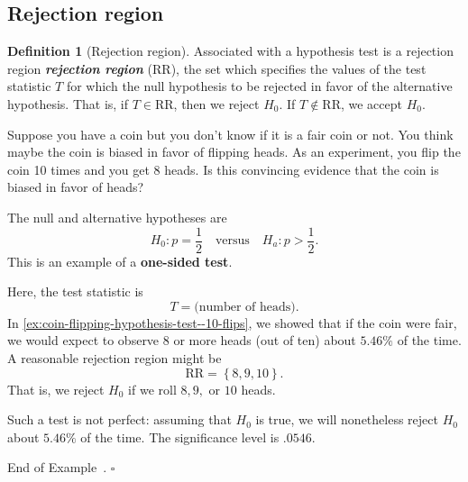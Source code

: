 \documentclass[10pt]{article}
\theoremstyle{definition}
\newtheorem{definition}[theorem]{Definition}
\newtheorem{example}[theorem]{Example}
\renewenvironment{example}
{\begin{oldexample}}
  {\par\smallskip\hfill   End of Example~\theexample. $\square$    \par\end{oldexample}}
\newcommand{\1}[1]{\textbf{1}_{\left[#1\right]}} %
\DeclareRobustCommand{\demph}[1]{%
  \ifmmode
  {\color{Blue}#1}%
  \else
  {\color{Blue}\bfseries\slshape #1}%
  \fi
}
\begin{document}
\newpage
\subsection{Rejection region}


\begin{definition}[Rejection region]
  \label{def:rejection-region}
  Associated with a hypothesis test is a \demph{rejection region} (RR), the set
  which specifies the values of the test statistic $T$ for which the null hypothesis
  to be rejected in favor of the alternative hypothesis. That is, if
  $T\in\mathrm{RR}$, then we reject $H_{0}$. If $T\notin \mathrm{\mathrm{RR}}$,
  we accept $H_{0}$.
\end{definition}

\begin{example}[One-sided test]
  Suppose you have a coin but you don't know if it is a fair coin or not. You
  think maybe the coin is biased in favor of flipping heads. As an experiment,
  you flip the coin 10 times and you get 8 heads. Is this convincing evidence
  that the coin is biased in favor of heads?

  The null and alternative hypotheses are
  \begin{equation*}
    H_{0}: p = \frac{1}{2} \quad \text{versus} \quad H_{a}: p> \frac{1}{2}.
  \end{equation*}
  This is an example of a \textbf{one-sided test}.

  Here, the test statistic is
  \begin{equation*}
    T=\text{(number of heads)}.
  \end{equation*}
  In \cref{ex:coin-flipping-hypothesis-test--10-flips}, we showed that if the
  coin were fair, we would expect to observe 8 or more heads (out of ten)
  about $5.46\%$ of the time. A reasonable rejection region might be
  \begin{equation*}
    \text{RR} = \left\{8,9,10\right\}.
  \end{equation*}
  That is, we reject $H_{0}$ if we roll $8,9,$ or $10$ heads.
  
  Such a test is not perfect: assuming that $H_{0}$ is true, we will
  nonetheless reject $H_{0}$ about $5.46\%$ of the time. The significance
  level is $.0546$.
\end{example}
\end{document}
